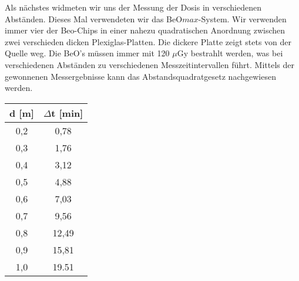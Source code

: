 Als nächstes widmeten wir uns der Messung der Dosis in verschiedenen Abständen. Dieses Mal verwendeten wir das BeO$max$-System. Wir verwenden immer vier der Beo-Chips in einer nahezu quadratischen Anordnung zwischen zwei verschieden dicken Plexiglas-Platten. Die dickere Platte zeigt stets von der Quelle weg.
Die BeO's müssen immer mit 120 $\mu$Gy bestrahlt werden, was bei verschiedenen Abständen zu verschiedenen Messzeitintervallen führt. Mittels der gewonnenen Messergebnisse kann das Abstandsquadratgesetz nachgewiesen werden. 

\begin{table}
	\begin{center}
		\begin{tabular}{c|c}
				   \textbf{d} [m] & \textbf{$\Delta$t} [min] \\ 
		\hline     0,2 &  0,78 \\ 
				   0,3 &  1,76 \\ 
				   0,4 &  3,12 \\ 
				   0,5 &  4,88 \\ 
				   0,6 &  7,03 \\ 
				   0,7 &  9,56 \\ 
				   0,8 & 12,49 \\ 
				   0,9 & 15,81 \\ 
				   1,0 & 19.51 \\  
		\end{tabular} 
	\end{center}
\end{table}

